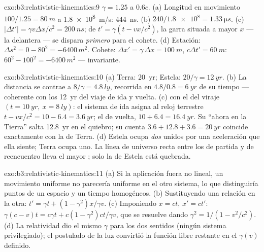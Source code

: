 \begin{solution}{exo:b3:relativistic-kinematics:9}
$\gamma = 1.25$ a $0.6c$. (a) Longitud en movimiento $100/1.25 = \qty{80}{m}$
a \qty{1.8e8}{m/s}: \qty{444}{ns}. (b) $240/\num{1.8e8} =
\qty{1.33}{\micro s}$. (c) $|\Delta t'| = \gamma v\Delta x/c^2 =
\qty{200}{ns}$; de $t' = \gamma(t - vx/c^2)$, la garra situada a mayor
$x$ --- la delantera --- se dispara \emph{primero} para el cohete. (d)
Estación: $\Delta s^2 = 0 - 80^2 = -6400\,\unit{m^2}$. Cohete: $\Delta
x' = \gamma\,\Delta x = \qty{100}{m}$, $c\Delta t' = \qty{60}{m}$:
$60^2 - 100^2 = -6400\,\unit{m^2}$ --- invariante.
\end{solution}

\begin{solution}{exo:b3:relativistic-kinematics:10}
(a) Terra: \qty{20}{yr}; Estela: $20/\gamma = \qty{12}{yr}$. (b) La
distancia se contrae a $8/\gamma = \qty{4.8}{ly}$, recorrida en $4.8/0.8
= \qty{6}{yr}$ de su tiempo --- coherente con los \qty{12}{yr} del viaje
de ida y vuelta. (c)  con el  del viraje $(t =
\qty{10}{yr},\ x = \qty{8}{ly})$: el sistema de ida asigna al reloj
terrestre $t - vx/c^2 = 10 - 6.4 = \qty{3.6}{yr}$; el de vuelta, $10 +
6.4 = \qty{16.4}{yr}$. Su ``ahora en la Tierra'' salta \qty{12.8}{yr}
en el quiebro; su cuenta $3.6 + 12.8 + 3.6 = \qty{20}{yr}$ coincide
exactamente con la de Terra. (d) Estela ocupa \emph{dos}  unidos por una aceleración que ella siente; Terra ocupa uno. La
línea de universo recta entre los  de partida y de reencuentro lleva
el mayor ; solo la de Estela está quebrada.
\end{solution}

\begin{solution}{exo:b3:relativistic-kinematics:11}
(a) Si la aplicación fuera no lineal, un movimiento uniforme no parecería
uniforme en el otro sistema, lo que distinguiría puntos de un espacio y un
tiempo homogéneos. (b) Sustituyendo una relación en la otra: $t' = \gamma t +
(1 - \gamma^2)x/\gamma v$. (c) Imponiendo $x = ct$, $x' = ct'$:
$\gamma(c - v)t = c\gamma t + c(1 - \gamma^2)ct/\gamma v$, que
se resuelve dando $\gamma^2 = 1/(1 - v^2/c^2)$. (d) La relatividad dio el
mismo $\gamma$ para los dos sentidos (ningún sistema privilegiado); el
postulado de la luz convirtió la función libre restante en el $\gamma(v)$
definido.
\end{solution}


